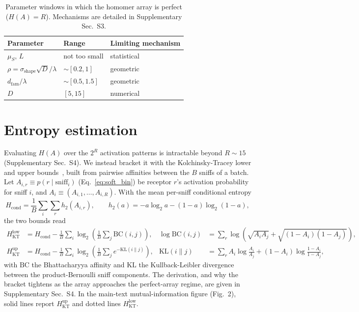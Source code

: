 \documentclass[aps,pre,superscriptaddress,floatfix,longbibliography,linenumbers]{revtex4-2}
\begin{document}
\begin{table}[t]
\centering
\begin{tabular}{lll}
Parameter & Range & Limiting mechanism \\
\hline
$\mu_S,\,L$ & not too small & statistical \\
$\rho=\sigma_\text{shape}\sqrt{D}/\lambda$ & $\sim[0.2,1]$ & geometric \\
$d_\text{fam}/\lambda$ & $\sim[0.5,1.5]$ & geometric \\
$D$ & $[5,15]$ & numerical \\
\end{tabular}
\caption{Parameter windows in which the homomer array is perfect
($H(A)=R$). Mechanisms are detailed in Supplementary Sec.~S3.}
\label{tab:windows}
\end{table}

\section{Entropy estimation}
\label{sec:entropy}

Evaluating $H(A)$ over the $2^R$ activation patterns is intractable beyond
$R\sim15$ (Supplementary Sec.~S4). We instead bracket it with the
Kolchinsky-Tracey lower and upper bounds~\cite{kolchinsky_estimating_2017},
built from pairwise affinities between the $B$ sniffs of a batch. Let
$A_{i,r}\equiv p(r\mid\text{sniff}_i)$ (Eq.~\eqref{eq:soft_bin}) be receptor
$r$'s activation probability for sniff $i$, and
$A_i\equiv(A_{i,1},\dots,A_{i,R})$. With the mean per-sniff conditional
entropy
\begin{equation}
H_\text{cond} = \frac{1}{B}\sum_i \sum_r h_2(A_{i,r}),
\qquad
h_2(a) = -a\log_2 a - (1-a)\log_2(1-a),
\label{eq:hcond}
\end{equation}
the two bounds read
\begin{align}
H_\text{KT}^\text{low} &= H_\text{cond} - \frac{1}{B}\sum_i \log_2\left(\frac{1}{B}\sum_j \text{BC}(i,j)\right),
& \log\text{BC}(i,j) &= \sum_r \log\left(\sqrt{A_iA_j}+\sqrt{(1-A_i)(1-A_j)}\right),
\label{eq:KTlow}\\
H_\text{KT}^\text{up} &= H_\text{cond} - \frac{1}{B}\sum_i \log_2\left(\frac{1}{B}\sum_j e^{-\text{KL}(i\|j)}\right),
& \text{KL}(i\|j) &= \sum_r A_i\log\frac{A_i}{A_j} + (1-A_i)\log\frac{1-A_i}{1-A_j},
\label{eq:KTup}
\end{align}
with $\text{BC}$ the Bhattacharyya affinity and $\text{KL}$ the
Kullback-Leibler divergence between the product-Bernoulli sniff components.
The derivation, and why the bracket tightens as the array approaches the
perfect-array regime, are given in Supplementary Sec.~S4. In the main-text
mutual-information figure (Fig.~2), solid lines report
$H_\text{KT}^\text{up}$ and dotted lines $H_\text{KT}^\text{low}$.



\end{document}
